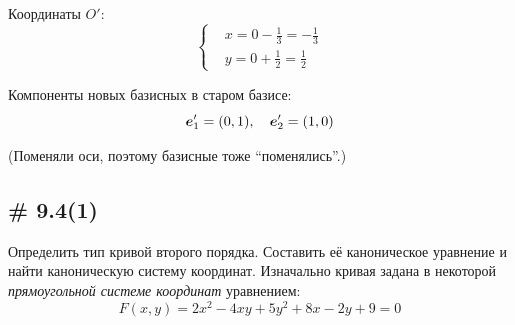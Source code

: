 \documentclass[a4paper,12pt]{article}
\begin{document}
\begin{solution}
    Координаты $O'$:
    \[
      \left\{
        \begin{aligned}
          &x = 0 - \frac{1}{3} = -\frac{1}{3}\\
          &y = 0 + \frac{1}{2} = \frac{1}{2}
        \end{aligned}
      \right.
    \]
    
    Компоненты новых базисных в старом базисе:
    \[
      \boldsymbol e_1' = (0, 1),\quad \boldsymbol e_2' = (1, 0)
    \]
    
    (Поменяли оси, поэтому базисные тоже ``поменялись''.)
  \end{solution}


  \subsection{\# 9.4(1)}
  
  Определить тип кривой второго порядка.
  Составить её каноническое уравнение и найти каноническую систему координат.
  Изначально кривая задана в некоторой \emph{прямоугольной системе координат} уравнением:
  \begin{equation}\label{eq:problem-9-4}
    F(x, y) = 2x^2 - 4xy + 5y^2 + 8x - 2y + 9 = 0
  \end{equation}
  
\end{document}
